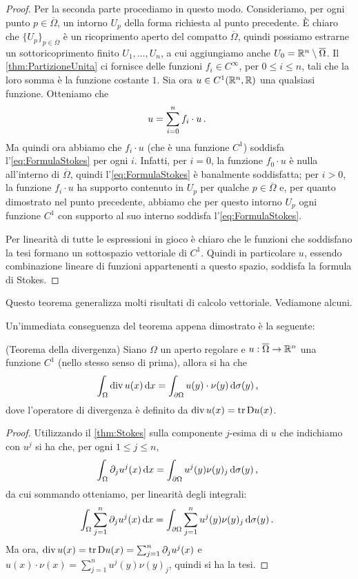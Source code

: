 \begin{proof}
	Per la seconda parte procediamo in questo modo.
	Consideriamo, per ogni punto $p\in \overline\Omega$, un intorno $U_p$ della forma richiesta al punto precedente. È chiaro che $\{U_p\}_{p\in\overline\Omega}$ è un
	ricoprimento aperto del compatto $\overline\Omega$, quindi possiamo estrarne un sottoricoprimento finito $U_1,\dots,U_n$, a cui aggiungiamo anche
	$U_0=\mathbb R^n \setminus \overline\Omega$. Il \cref{thm:PartizioneUnita} ci fornisce delle funzioni $f_i\in C^{\infty}$, per $0\leq i \leq n$,
	tali che la loro somma è la funzione costante $1$.
	Sia ora $u\in C^1(\mathbb R^n,\mathbb R)$ una qualsiasi funzione. Otteniamo che
	\[
		u = \sum_{i=0}^n f_i\cdot u\, \text{. }
	\]
	Ma quindi ora abbiamo che $f_i \cdot u$ (che è una funzione $C^1$) soddisfa l'\cref{eq:FormulaStokes} per ogni $i$.
	Infatti, per $i=0$, la funzione $f_0\cdot u$ è nulla all'interno di $\overline\Omega$, quindi l'\cref{eq:FormulaStokes} è banalmente soddisfatta; per $i>0$, la funzione $f_i \cdot u$ ha supporto contenuto in $U_p$ per qualche $p\in \overline\Omega$ e, per quanto
	dimostrato nel punto precedente, abbiamo che per questo intorno $U_p$ ogni funzione $C^1$ con supporto al suo interno soddisfa l'\cref{eq:FormulaStokes}.
	
	Per linearità di tutte le espressioni in gioco è chiaro che le funzioni che soddisfano la tesi formano
	un sottospazio vettoriale di $C^1$. Quindi in particolare $u$, essendo combinazione lineare di funzioni appartenenti a questo spazio, soddisfa la formula di Stokes.
\end{proof}

Questo teorema generalizza molti risultati di calcolo vettoriale. Vediamone alcuni.

Un'immediata conseguenza del teorema appena dimostrato è la seguente:

\begin{corollary}(Teorema della divergenza)
	\label{cor:thDivergenza}
	Siano $\Omega$ un aperto regolare e $u:\overline\Omega \rightarrow \mathbb R^n$ una funzione $C^1$ (nello stesso senso di prima), allora si ha che
	\begin{equation}\label{eq:thDivergenza}
		\int_{\Omega} \operatorname{div} u (x) \,\mathrm d x = \int_{\partial \Omega} u(y)\cdot\nu(y) \,\mathrm d \sigma(y)\, \text{, }
	\end{equation}
	dove l'operatore di divergenza è definito da $\operatorname{div} u(x)=\operatorname{tr}\mathrm D u(x)$.
\end{corollary}

\begin{proof}
	Utilizzando il \cref{thm:Stokes} sulla componente $j$-esima di $u$ che indichiamo con $u^j$ si ha che, per ogni $1\leq j\leq n$,
	\[
		\int_{\Omega} \partial_j u^j(x) \,\mathrm d x = \int_{\partial \Omega} u^j(y)\nu(y)_j \,\mathrm d \sigma(y)\, \text{, }
	\]
	da cui sommando otteniamo, per linearità degli integrali:
	\[
		\int_{\Omega} \sum_{j=1}^n\partial_j u^j(x) \,\mathrm d x = \int_{\partial \Omega} \sum_{j=1}^n u^j(y)\nu(y)_j \,\mathrm d \sigma(y)\, \text{. }
	\]
	Ma ora, $\operatorname{div} u (x)= \operatorname{tr}\mathrm D u(x) = \sum_{j=1}^n \partial_j u^j(x)$ e $u(x)\cdot\nu(x)=\sum_{j=1}^n u^j(y)\nu(y)_j$,
	quindi si ha la tesi.
\end{proof}

